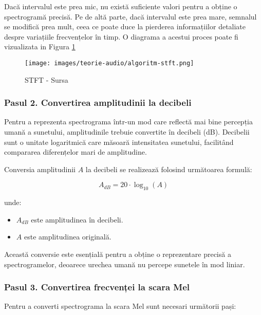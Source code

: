 Dacă intervalul este prea mic, nu există suficiente valori pentru a obține o spectrogramă precisă. Pe de altă parte, dacă intervalul este prea mare, semnalul se modifică prea mult, ceea ce poate duce la pierderea informațiilor detaliate despre variațiile frecvențelor în timp. O diagrama a acestui proces poate fi vizualizata in Figura \ref{fig:stftProcess}

\begin{figure}
    \centering
    \texttt{[image: images/teorie-audio/algoritm-stft.png]}
    \caption{STFT - Sursa \cite{stftProcess}}
    \label{fig:stftProcess}
\end{figure}

\subsubsection{Pasul 2. Convertirea amplitudinii la decibeli}

Pentru a reprezenta spectrograma într-un mod care reflectă mai bine percepția umană a sunetului, amplitudinile trebuie convertite în decibeli (dB). Decibelii sunt o unitate logaritmică care măsoară intensitatea sunetului, facilitând compararea diferențelor mari de amplitudine.

Conversia amplitudinii \(A\) la decibeli se realizează folosind următoarea formulă:

\[
A_{dB} = 20 \cdot \log_{10}(A)
\]

unde:
\begin{itemize}
    \item \(A_{dB}\) este amplitudinea în decibeli.
    \item \(A\) este amplitudinea originală.
\end{itemize}

Această conversie este esențială pentru a obține o reprezentare precisă a spectrogramelor, deoarece urechea umană nu percepe sunetele în mod liniar.


\subsubsection{Pasul 3. Convertirea frecvenței la scara Mel}

Pentru a converti spectrograma la scara Mel sunt necesari următorii pași:

